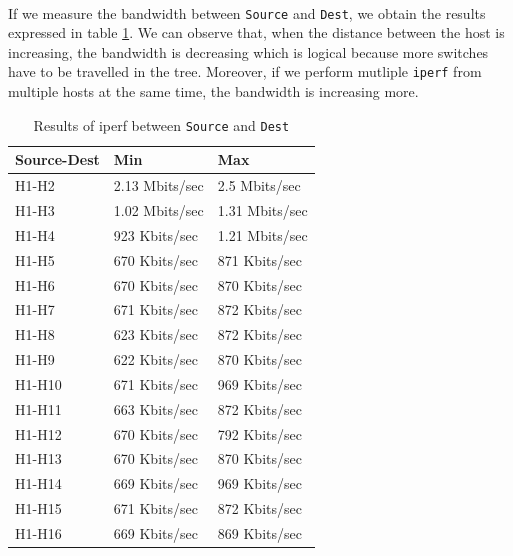 \documentclass[a4paper, 11pt, oneside]{article}
\begin{document}
\paragraph{}If we measure the bandwidth between \texttt{Source} and \texttt{Dest}, we obtain the results expressed in table \ref{table:ST_bw}. We can observe that, when the distance between the host is increasing, the bandwidth is decreasing which is logical because more switches have to be travelled in the tree. Moreover, if we perform mutliple \texttt{iperf} from multiple hosts at the same time, the bandwidth is increasing more.

\begin{table}[H]
    \centering
    \begin{tabular}{|l|l|l|}
    \hline
    \textbf{Source-Dest} & \textbf{Min}   & \textbf{Max}   \\ \hline
    H1-H2                & 2.13 Mbits/sec & 2.5 Mbits/sec  \\ \hline
    H1-H3                & 1.02 Mbits/sec & 1.31 Mbits/sec \\ \hline
    H1-H4                & 923 Kbits/sec  & 1.21 Mbits/sec \\ \hline
    H1-H5                & 670 Kbits/sec  & 871 Kbits/sec  \\ \hline
    H1-H6                & 670 Kbits/sec  & 870 Kbits/sec  \\ \hline
    H1-H7                & 671 Kbits/sec  & 872 Kbits/sec  \\ \hline
    H1-H8                & 623 Kbits/sec  & 872 Kbits/sec  \\ \hline
    H1-H9                & 622 Kbits/sec  & 870 Kbits/sec  \\ \hline
    H1-H10               & 671 Kbits/sec  & 969 Kbits/sec  \\ \hline
    H1-H11               & 663 Kbits/sec  & 872 Kbits/sec  \\ \hline
    H1-H12               & 670 Kbits/sec  & 792 Kbits/sec  \\ \hline
    H1-H13               & 670 Kbits/sec  & 870 Kbits/sec  \\ \hline
    H1-H14               & 669 Kbits/sec  & 969 Kbits/sec  \\ \hline
    H1-H15               & 671 Kbits/sec  & 872 Kbits/sec  \\ \hline
    H1-H16               & 669 Kbits/sec  & 869 Kbits/sec  \\ \hline
    \end{tabular}
    \caption{Results of iperf between \texttt{Source} and \texttt{Dest}}
    \label{table:ST_bw}
    \end{table}
\end{document}
